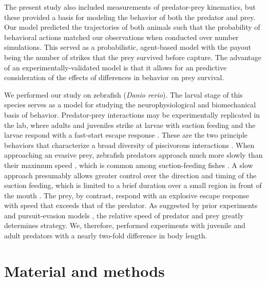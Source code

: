 \documentclass[]{rsos}%
\begin{document}
The present study also included measurements of predator-prey kinematics, but these provided a basis for modeling the behavior of both the predator and prey.
Our model predicted the trajectories of both animals such that the probability of behavioral actions matched our observations when conducted over number simulations.
This served as a probabilistic, agent-based model with the payout being the number of strikes that the prey survived before capture.
The advantage of an experimentally-validated model is that it allows for an predictive consideration of the effects of differences in behavior on prey survival.

We performed our study on zebrafish (\textit{Danio rerio}). 
The larval stage of this species serves as a model for studying the neurophysiological \cite{Bianco:2015gm,Bagnall:2014iu,Huang:2013vj} and biomechanical \cite{Muller:2004hp,Li:2016cy} basis of behavior.
Predator-prey interactions may be experimentally replicated in the lab, where adults and juveniles strike at larvae with suction feeding and the larvae respond with a fast-start escape response \cite{Stewart:2013bha}.
These are the two principle behaviors that characterize a broad diversity of piscivorous interactions \cite{Weihs:1984tb,Walker:2005vn}. 
When approaching an evasive prey, zebrafish predators approach much more slowly than their maximum speed \cite{Stewart:2013bha}, which is common among suction-feeding fishes \cite{Webb:1984jz,Higham:2007go}.
A slow approach presumably allows greater control over the direction and timing of the suction feeding, which is limited to a brief duration over a small region in front of the mouth \cite{Holzman:2008jc,Holzman:2009uu}. 
The prey, by contrast, respond with an explosive escape response with speed that exceeds that of the predator. 
As suggested by prior experiments \cite{Fuiman:1994td} and pursuit-evasion models \cite{Weihs:1984tb}, the relative speed of predator and prey greatly determines strategy.
We, therefore, performed experiments with juvenile and adult predators with a nearly two-fold difference in body length.


\section{Material and methods}
\end{document}
